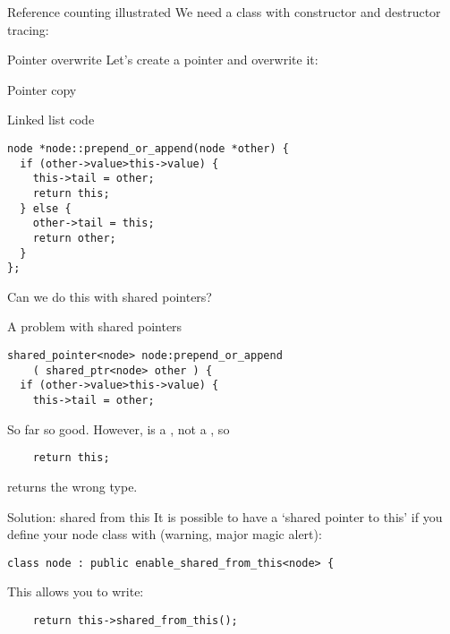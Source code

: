 \begin{block}{Reference counting illustrated}
  \label{sl:construct-destruct-trace}
  We need a class with constructor and destructor tracing:
\end{block}

\begin{block}{Pointer overwrite}
  \label{sl:shared-ptr-overwrite}
  Let's create a pointer and overwrite it:
\end{block}

\begin{block}{Pointer copy}
  \label{sl:shared-ptr-copy}
\end{block}

\begin{block}{Linked list code}\par 
  \label{sl:share-ptr-node}
\begin{verbatim}
node *node::prepend_or_append(node *other) {
  if (other->value>this->value) {
    this->tail = other;
    return this;
  } else {
    other->tail = this;
    return other;
  }
};
\end{verbatim}
Can we do this with shared pointers?
\end{block}

\begin{block}{A problem with shared pointers}
  \label{sl:share-ptr-node-sh}
\begin{verbatim}
shared_pointer<node> node:prepend_or_append
    ( shared_ptr<node> other ) {
  if (other->value>this->value) {
    this->tail = other;
\end{verbatim}
So far so good. However,  is a , not a
, so
\begin{verbatim}
    return this;
\end{verbatim}
returns the wrong type.
\end{block}

\begin{block}{Solution: shared from this}
  \label{sl:share-ptr-node-from}
  It is possible to have a `shared pointer to this' if you
  define your node class with (warning, major magic alert):
\begin{verbatim}
class node : public enable_shared_from_this<node> {
\end{verbatim}
This allows you to write:
\begin{verbatim}
    return this->shared_from_this();
\end{verbatim}
\end{block}
